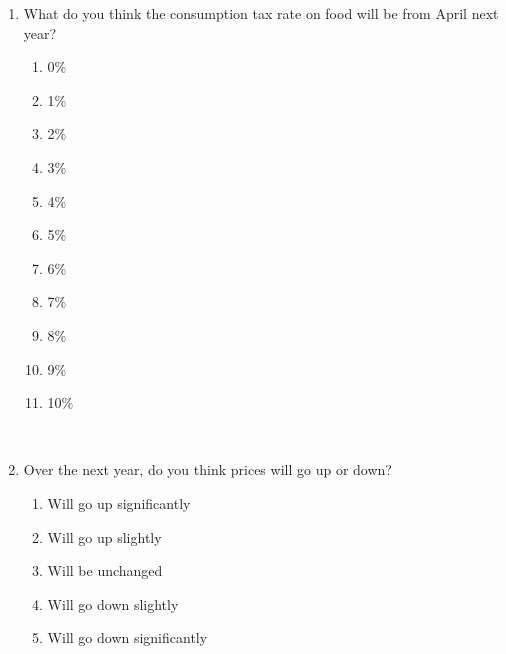 \documentclass[a4paper,12pt]{article}
\begin{document}
\begin{enumerate}
\

\item[Q.3.] What do you think the consumption tax rate on food will be from April next year?
	\begin{enumerate}[(1)]
	\item 0\%
	\item 1\%
	\item 2\%
	\item 3\%
	\item 4\%
	\item 5\%
	\item 6\%
	\item 7\%
	\item 8\%
	\item 9\%
	\item 10\%
	\end{enumerate}

\

\item[Q.4.] Over the next year, do you think prices will go up or down?
	\begin{enumerate}[(1)]
	\item Will go up significantly
	\item Will go up slightly
	\item Will be unchanged
	\item Will go down slightly
	\item Will go down significantly
	\end{enumerate}

\


\end{enumerate}
\end{document}
